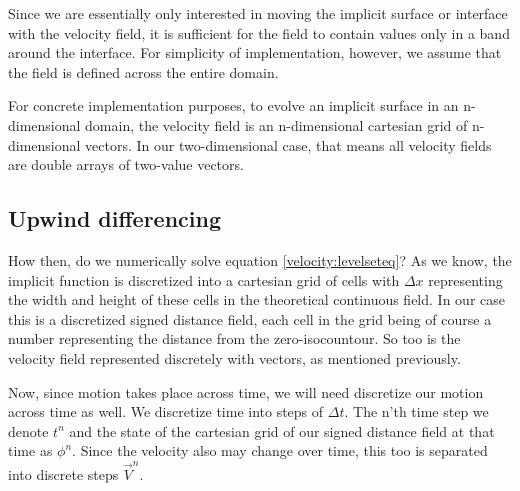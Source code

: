 Since we are essentially only interested in moving the implicit surface or interface with the velocity field, it is sufficient for the field to contain values only in a band around the interface. For simplicity of implementation, however, we assume that the field is defined across the entire domain.

For concrete implementation purposes, to evolve an implicit surface in an n-dimensional domain, the velocity field is an n-dimensional cartesian grid of n-dimensional vectors. In our two-dimensional case, that means all velocity fields are double arrays of two-value vectors.

\subsection{Upwind differencing}
How then, do we numerically solve equation \ref{velocity:levelseteq}? As we know, the implicit function is discretized into a cartesian grid of cells with $\Delta x$ representing the width and height of these cells in the theoretical continuous field. In our case this is a discretized signed distance field, each cell in the grid being of course a number representing the distance from the zero-isocountour. So too is the velocity field represented discretely with vectors, as mentioned previously.

Now, since motion takes place across time, we will need discretize our
motion across time as well. We discretize time into steps of $\Delta
t$. The n'th time step we denote $t^n$ and the state of the cartesian
grid of our signed distance field at that time as $\phi^n$. Since the
velocity also may change over time, this too is separated into
discrete steps $\vec{V}^n$.

